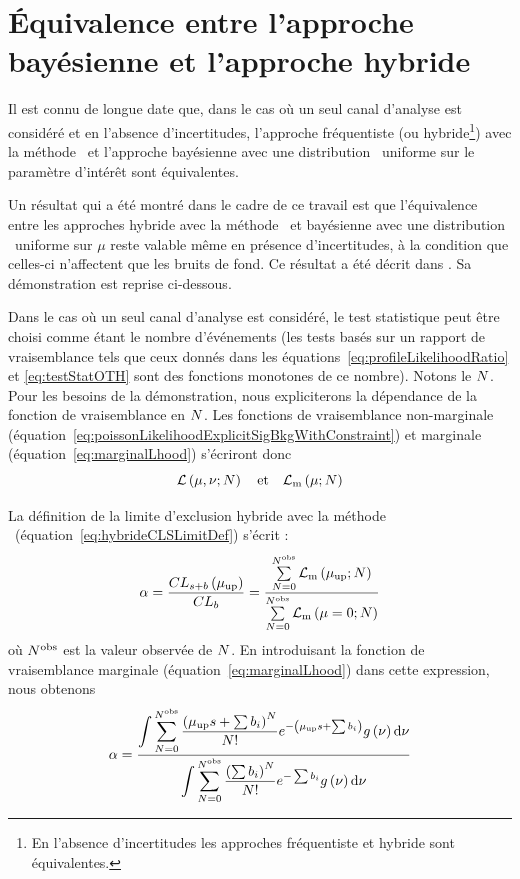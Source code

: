 
\section{\'Equivalence entre l'approche bayésienne et l'approche hybride}
\label{eq:equivalenceHybridBayesian}

Il est connu de longue date que, dans le cas o\`u un seul canal d'analyse est consid\'er\'e et en l'absence d'incertitudes, l'approche fr\'equentiste (ou hybride\footnote{En l'absence d'incertitudes les approches fr\'equentiste et hybride sont \'equivalentes.}) avec la m\'ethode \CLs~et l'approche bay\'esienne avec une distribution \prior~uniforme sur le param\`etre d'int\'er\^et sont \'equivalentes. 

Un r\'esultat qui a \'et\'e montr\'e dans le cadre de ce travail est que l'\'equivalence entre les approches hybride avec la m\'ethode \CLs~et bay\'esienne avec une distribution \prior~uniforme sur $\mu$ reste valable m\^eme en pr\'esence d'incertitudes, \`a la condition que celles-ci n'affectent que les bruits de fond. Ce r\'esultat a \'et\'e d\'ecrit dans \cite{2014arXiv1404.1340B}. Sa d\'emonstration est reprise ci-dessous.

Dans le cas o\`u un seul canal d'analyse est consid\'er\'e, le test statistique peut \^etre choisi comme \'etant le nombre d'\'ev\'enements (les tests bas\'es sur un rapport de vraisemblance tels que ceux donn\'es dans les \'equations~\ref{eq:profileLikelihoodRatio} et \ref{eq:testStatOTH} sont des fonctions monotones de ce nombre). Notons le $N$. Pour les besoins de la d\'emonstration, nous expliciterons la d\'ependance de la fonction de vraisemblance en $N$. Les fonctions de vraisemblance non-marginale (\'equation~\ref{eq:poissonLikelihoodExplicitSigBkgWithConstraint}) et marginale (\'equation~\ref{eq:marginalLhood}) s'\'ecriront donc
\[{\cal L}\left(\mu,\nu;N\right)\quad\text{et}\quad{\cal L}_\text{m}\left(\mu;N\right)\]

La d\'efinition de la limite d'exclusion hybride avec la m\'ethode \CLs~(\'equation~\ref{eq:hybrideCLSLimitDef}) s'\'ecrit :
\[\alpha=\frac{CL_{s+b}\left(\mu_{\text{up}}\right)}{CL_b}=\frac{\sum\limits_{N=0}^{N^{\text{obs}}}{\cal L}_\text{m}\left(\mu_{\text{up}};N\right)}{\sum\limits_{N=0}^{N^{\text{obs}}}{\cal L}_\text{m}\left(\mu=0;N\right)}\]
o\`u $N^{\text{obs}}$ est la valeur observ\'ee de $N$. En introduisant la fonction de vraisemblance marginale (\'equation~\ref{eq:marginalLhood}) dans cette expression, nous obtenons
\[\alpha=\frac{\displaystyle\int\sum\limits_{N=0}^{N^{\text{obs}}}\frac{\left(\mu_{\text{up}} s+\sum b_i\right)^{N}}{N!}e^{-\left(\mu_{\text{up}} s+\sum b_i\right)}g\left(\nu\right){\rm d}\nu}{\displaystyle\int\sum\limits_{N=0}^{N^{\text{obs}}}\frac{\left(\sum b_i\right)^{N}}{N!}e^{-\sum b_i}g\left(\nu\right){\rm d}\nu}\]

